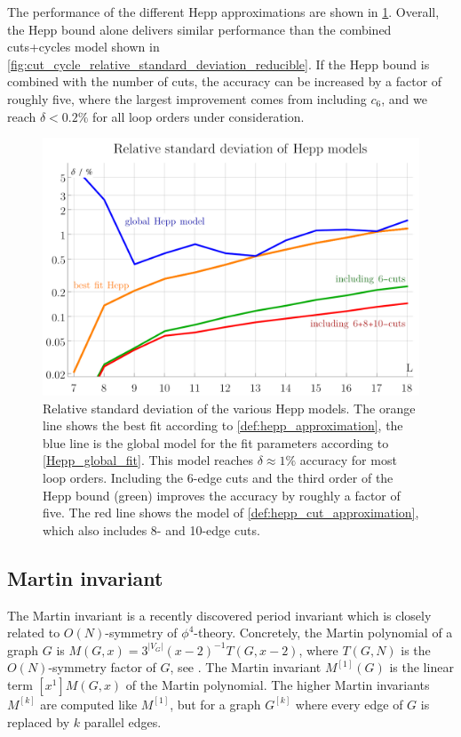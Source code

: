 \documentclass[12pt]{article}
\numberwithin{equation}{section}
\newcommand{\abs}[1]{\lvert #1 \rvert}
\begin{document}
The performance of the different Hepp approximations are shown in \cref{fig:hepp_standard_deviation}. Overall, the Hepp bound alone delivers similar performance than the combined cuts+cycles model shown in \cref{fig:cut_cycle_relative_standard_deviation_reducible}. If the Hepp bound is combined with the number of cuts, the accuracy can be increased by a factor of roughly five, where the largest improvement comes from including $c_6$, and we reach $\delta < 0.2\%$ for all loop orders under consideration.









\begin{figure}[htb]
	\centering
	\includegraphics[width=.6\linewidth]{figures/hepp_standard_deviation}
	\caption{  Relative standard deviation of the various Hepp models. The orange line shows the best fit according to \cref{def:hepp_approximation}, the blue line is the global model for the fit parameters according to \cref{Hepp_global_fit}. This model reaches $\delta \approx 1\%$ accuracy for most loop orders. Including the 6-edge cuts and the third order of the Hepp bound (green) improves the accuracy by roughly a factor of five. The red line shows the model of \cref{def:hepp_cut_approximation}, which also includes 8- and 10-edge cuts.
	}
	\label{fig:hepp_standard_deviation}
	
\end{figure}





\subsection{Martin invariant}\label{sec:martin}


The Martin invariant \cite{panzer_feynman_2023} is a recently discovered period invariant which is closely related to  $O(N)$-symmetry of $\phi^4$-theory. Concretely, the Martin polynomial of a graph $G$ is $M(G,x)=3^{\abs{V_G}}(x-2)^{-1}  T(G,x-2) $, where  $T(G,N)$ is the $O(N)$-symmetry factor of $G$, see \cite{balduf_statistics_2023}. The Martin invariant $M^{[1]}(G)$ is the linear term   $[x^1]M(G,x)$ of the Martin polynomial. The higher Martin invariants $M^{[k]}$ are computed like $M^{[1]}$, but for a graph $G^{[k]}$ where every edge of $G$ is replaced by $k$ parallel edges. 
\end{document}
